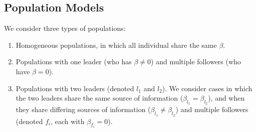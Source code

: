 \documentclass[pageno]{jpaper}
\begin{document}
\subsection{Population Models}
%

We consider three types of populations:
\begin{enumerate}
\item Homogeneous populations, in which all individual share the same $\beta$.
\item Populations with one leader (who has $\beta\neq0$) and multiple followers (who have $\beta=0$).
\item Populations with two leaders (denoted $l_1$ and $l_2$). We consider cases in which the two leaders share the same source of information ($\beta_{l_1}=\beta_{l_2}$), and when they share differing sources of information ($\beta_{l_1}\neq\beta_{l_2}$) and multiple followers (denoted $f_i$, each with $\beta_{f_i}=0$).
\end{enumerate}
\end{document}
